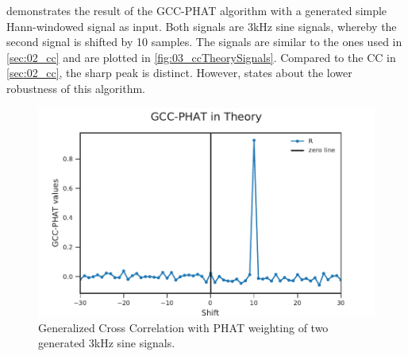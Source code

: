  demonstrates the result of the \ac{GCC-PHAT} algorithm with a generated
simple Hann-windowed signal as input. Both signals are 3\si{\kilo\hertz} sine signals, whereby
the second signal is shifted by 10 samples.
The signals are similar to the ones used in \cref{sec:02_cc}
and are plotted in \cref{fig:03_ccTheorySignals}.
Compared to the \ac{CC} in \cref{sec:02_cc}, the sharp peak is distinct.
However, \cite{K_C_GCC} states about the lower robustness of this algorithm.
\begin{figure}[ht]
	\centering
		\includegraphics[width=0.9\columnwidth]{figures/GCC_theory}
	\caption{Generalized Cross Correlation with PHAT weighting of two generated 3\si{\kilo\hertz} sine signals.}
    \label{fig:02_gccTheory}
\end{figure}

